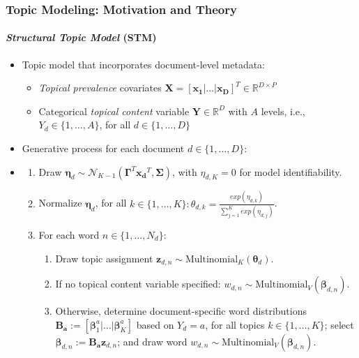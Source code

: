\documentclass[xcolor=dvipsnames]{beamer}
\begin{document}
\begin{frame}
\frametitle{Topic Modeling: Motivation and Theory}
\framesubtitle{\textit{Structural Topic Model} (STM)}
\begin{itemize}
\item Topic model that incorporates document-level metadata: 
\begin{itemize}
\item \textit{Topical prevalence} covariates $\boldsymbol{X}=[\boldsymbol{x_1}|\dots|\boldsymbol{x_D}]^T \in \mathbb{R}^{D \times P}$
\item Categorical \textit{topical content} variable $\boldsymbol{Y}\in \mathbb{R}^D$ with $A$ levels, i.e., $Y_d \in \{1,\dots,A\}$, for all $d \in \{1,\dots,D\}$
\end{itemize}
\item Generative process for each document $d \in \{1,\dots,D\}$:
\item[] 
\begin{enumerate}[{1)}]
\item Draw $\boldsymbol{\eta}_d \sim \mathcal{N}_{K-1}(\boldsymbol{\Gamma}^T\boldsymbol{x_d}^T, \boldsymbol{\Sigma})$, with $\eta_{d,K}=0$ for model identifiability.
\item Normalize $\boldsymbol{\eta}_d$, for all $k \in \{1,\dots,K\}: \theta_{d,k} = \frac{exp(\eta_{d,k})}{\sum_{j=1}^{K}exp(\eta_{d,j})}$.
\item For each word $n \in \{1,\dots,N_d\}$:
	\begin{enumerate}[{a)}]
    \item Draw topic assignment $\boldsymbol{z}_{d,n} \sim \text{Multinomial}_K(\boldsymbol{\theta}_d)$.
    \item If no topical content variable specified: $w_{d,n} \sim \text{Multinomial}_V(\boldsymbol{\beta}_{d,n})$. 
    \item[] Otherwise, determine document-specific word distributions $\boldsymbol{B_a} := [\boldsymbol{\beta}^a_1|\dots|\boldsymbol{\beta}^a_K]$ based on $Y_d=a$, for all topics $k \in \{1,\dots,K\}$; select $\boldsymbol{\beta}_{d,n}:=\boldsymbol{B_a}\boldsymbol{z}_{d,n}$; and draw word $w_{d,n} \sim \text{Multinomial}_V(\boldsymbol{\beta}_{d,n})$.
	\end{enumerate}
\end{enumerate}
\end{itemize}
\end{frame}
\end{document}
